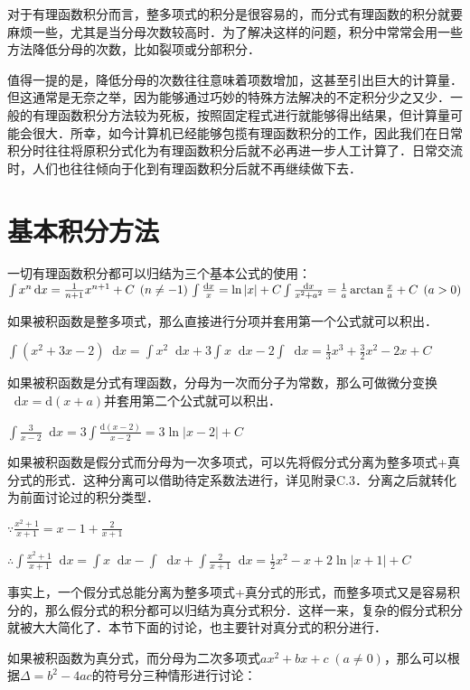 \documentclass{ctexbook}
\newcommand*{\dif}{\mathop{}\!\mathrm{d}}
\begin{document}
对于有理函数积分而言，整多项式的积分是很容易的，而分式有理函数的积分就要麻烦一些，尤其是当分母次数较高时．为了解决这样的问题，积分中常常会用一些方法降低分母的次数，比如裂项或分部积分．\par
值得一提的是，降低分母的次数往往意味着项数增加，这甚至引出巨大的计算量．但这通常是无奈之举，因为能够通过巧妙的特殊方法解决的不定积分少之又少．一般的有理函数积分方法较为死板，按照固定程式进行就能够得出结果，但计算量可能会很大．所幸，如今计算机已经能够包揽有理函数积分的工作，因此我们在日常积分时往往将原积分式化为有理函数积分后就不必再进一步人工计算了．日常交流时，人们也往往倾向于化到有理函数积分后就不再继续做下去．\par
\section{基本积分方法}
一切有理函数积分都可以归结为三个基本公式的使用：\\
$\int x^{n}\dif{x}=\frac{1}{n+1}x^{n+1}+C\;\left(n\ne-1\right)\\\int\frac{\dif{x}}{x}=\ln{|x|}+C\\\int\frac{\dif{x}}{x^{2}+a^{2}}=\frac{1}{a}\arctan{\frac{x}{a}}+C\;\left(a>0\right)$\par
如果被积函数是整多项式，那么直接进行分项并套用第一个公式就可以积出．\par
$\int\left(x^{2}+3x-2\right)\dif{x}=\int x^{2}\dif{x}+3\int x\dif{x}-2\int\dif{x}=\frac{1}{3}x^{3}+\frac{3}{2}x^{2}-2x+C$\par
如果被积函数是分式有理函数，分母为一次而分子为常数，那么可做微分变换$\dif{x}=\mathrm{d}\left(x+a\right)$并套用第二个公式就可以积出．\par
$\int\frac{3}{x-2}\dif{x}=3\int\frac{\mathrm{d}\left(x-2\right)}{x-2}=3\ln{|x-2|}+C$\par
如果被积函数是假分式而分母为一次多项式，可以先将假分式分离为整多项式+真分式的形式．这种分离可以借助待定系数法进行，详见附录C.3．分离之后就转化为前面讨论过的积分类型．\par
$\because\frac{x^{2}+1}{x+1}=x-1+\frac{2}{x+1}$\par
$\therefore\int\frac{x^{2}+1}{x+1}\dif{x}=\int x\dif{x}-\int\dif{x}+\int\frac{2}{x+1}\dif{x}=\frac{1}{2}x^{2}-x+2\ln{|x+1|}+C$\par
事实上，一个假分式总能分离为整多项式+真分式的形式，而整多项式又是容易积分的，那么假分式的积分都可以归结为真分式积分．这样一来，复杂的假分式积分就被大大简化了．本节下面的讨论，也主要针对真分式的积分进行．\par
如果被积函数为真分式，而分母为二次多项式$ax^{2}+bx+c\;\left(a\ne0\right)$，那么可以根据$\Delta=b^{2}-4ac$的符号分三种情形进行讨论：\par
\end{document}
